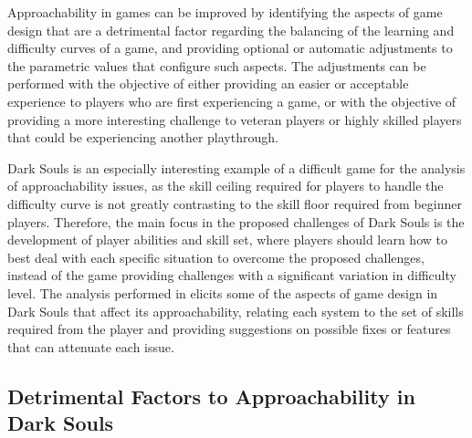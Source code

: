 Approachability in games can be improved by identifying the aspects of game design that are a detrimental factor regarding the balancing of the learning and difficulty curves of a game, and providing optional or automatic adjustments to the parametric values that configure such aspects. The adjustments can be performed with the objective of either providing an easier or acceptable experience to players who are first experiencing a game, or with the objective of providing a more interesting challenge to veteran players or highly skilled players that could be experiencing another playthrough.

Dark Souls is an especially interesting example of a difficult game for the analysis of  approachability issues, as the skill ceiling required for players to handle the difficulty curve is not greatly contrasting to the skill floor required from beginner players. Therefore, the main focus in the proposed challenges of Dark Souls is the development of player abilities and skill set, where players should learn how to best deal with each specific situation to overcome the proposed challenges, instead of the game providing challenges with a significant variation in difficulty level. The analysis performed in \cite{ONLINE_ApproachabilityFixDarkSouls} elicits some of the aspects of game design in Dark Souls that affect its approachability, relating each system to the set of skills required from the player and providing suggestions on possible fixes or features that can attenuate each issue.

\subsection{Detrimental Factors to Approachability in Dark Souls}
\label{sec:detrimental-factors-approachability}


